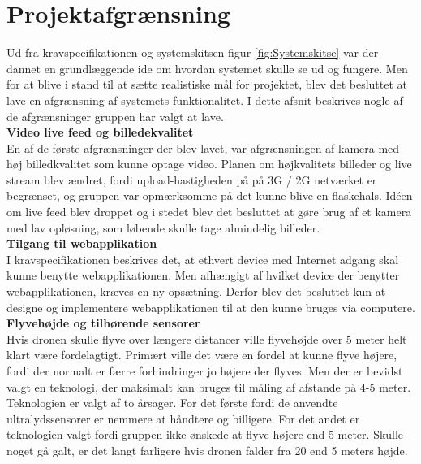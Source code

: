 \chapter{Projektafgrænsning}



Ud fra kravspecifikationen og systemskitsen figur \ref{fig:Systemskitse} var der dannet en grundlæggende ide om hvordan systemet skulle se ud og fungere. Men for at blive i stand til at sætte realistiske mål for projektet, blev det besluttet at lave en afgrænsning af systemets funktionalitet. I dette afsnit beskrives nogle af de afgrænsninger gruppen har valgt at lave. \\


\textbf{Video live feed og billedekvalitet}\\
En af de første afgrænsninger der blev lavet, var afgrænsningen af kamera med høj billedkvalitet som kunne optage video. Planen om højkvalitets billeder og live stream blev ændret, fordi upload-hastigheden på på 3G / 2G netværket er begrænset, og gruppen var opmærksomme på det kunne blive en flaskehals. Idéen om live feed blev droppet og i stedet blev det besluttet at gøre brug af et kamera med lav opløsning, som løbende skulle tage almindelig billeder.\\

\textbf{Tilgang til webapplikation}\\
I kravspecifikationen beskrives det, at ethvert device med Internet adgang skal kunne benytte webapplikationen. Men afhængigt af hvilket device der benytter webapplikationen, kræves en ny opsætning. Derfor blev det besluttet kun at designe og implementere webapplikationen til at den kunne bruges via computere.\\

\textbf{Flyvehøjde og tilhørende sensorer}\\
Hvis dronen skulle flyve over længere distancer ville flyvehøjde over 5 meter helt klart være fordelagtigt. Primært ville det være en fordel at kunne flyve højere, fordi der normalt er færre forhindringer jo højere der flyves. Men der er bevidst valgt en teknologi, der maksimalt kan bruges til måling af afstande på 4-5 meter. Teknologien er valgt af to årsager. For det første fordi de anvendte ultralydssensorer er nemmere at håndtere og billigere. For det andet er teknologien valgt fordi gruppen ikke ønskede at flyve højere end 5 meter. Skulle noget gå galt, er det langt farligere hvis dronen falder fra 20 end 5 meters højde.  
